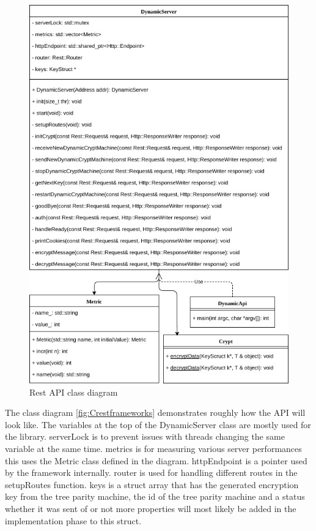 \begin{figure}[!h]
  \centering
      \includegraphics[width=1\textwidth]{Figures/API.jpg}
  \caption[Rest API class diagram]{Rest API class diagram}
  \label{fig:myapi}
\end{figure}

\FloatBarrier

The class diagram \ref{fig:Crestframeworks} demonstrates roughly how the API will look like. The variables at the top of the DynamicServer class are mostly used for the library. serverLock is to prevent issues with threads changing the same variable at the same time. metrics is for measuring various server performances this uses the Metric class defined in the diagram. httpEndpoint is a pointer used by the framework internally. router is used for handling different routes in the setupRoutes function. keys is a struct array that has the generated encryption key from the tree parity machine, the id of the tree parity machine and a status whether it was sent of or not more properties will most likely be added in the implementation phase to this struct.

